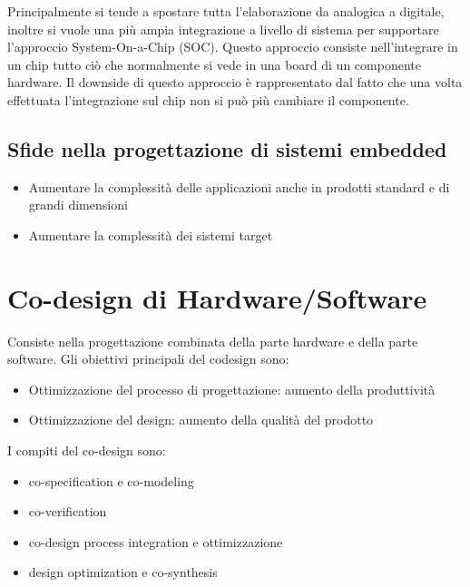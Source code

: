 \documentclass[a4paper]{article}
\theoremstyle{definition}
\begin{document}
		\noindent
		Principalmente si tende a spostare tutta l'elaborazione da analogica a digitale, inoltre si vuole una più ampia integrazione a livello di sistema per supportare l'approccio System-On-a-Chip (SOC). Questo approccio consiste nell'integrare in un chip tutto ciò che normalmente si vede in una board di un componente hardware. Il downside di questo approccio è rappresentato dal fatto che una volta effettuata l'integrazione sul chip non si può più cambiare il componente.
		 
	
	\subsection{Sfide nella progettazione di sistemi embedded}
		\begin{itemize}
			\item Aumentare la complessità delle applicazioni anche in prodotti standard e di grandi dimensioni
			\item Aumentare la complessità dei sistemi target
		\end{itemize}
		
	\section{Co-design di Hardware/Software }
		Consiste nella progettazione combinata della parte hardware e della parte software.
		Gli obiettivi principali del codesign sono:
		\begin{itemize}
			\item Ottimizzazione del processo di progettazione: aumento della produttività
			\item Ottimizzazione del design: aumento della qualità del prodotto
		\end{itemize}
		
		\begin{center}
		\end{center}
		\bigskip
		
		\noindent
		I compiti del co-design sono:
		\begin{itemize}
			\item co-specification e co-modeling
			\item co-verification
			\item co-design process integration e ottimizzazione
			\item design optimization e co-synthesis
		\end{itemize}
	
\end{document}
